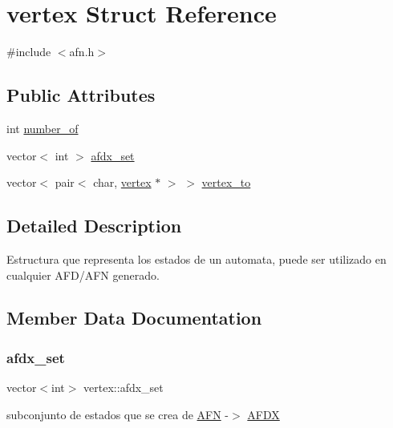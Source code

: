 \hypertarget{structvertex}{}\section{vertex Struct Reference}
\label{structvertex}


{\ttfamily \#include $<$afn.\+h$>$}

\subsection*{Public Attributes}
{\bf }\par
\begin{DoxyCompactItemize}
\item 
int \hyperlink{structvertex_a20bec257a9da87360e7eff821886331b}{number\+\_\+of}
\item 
vector$<$ int $>$ \hyperlink{structvertex_ac03479cb9e9f8fd0ee66e9f14fca15a9}{afdx\+\_\+set}
\item 
vector$<$ pair$<$ char, \hyperlink{structvertex}{vertex} $\ast$ $>$ $>$ \hyperlink{structvertex_af4c8458ab477f8d174bd3764611f18f6}{vertex\+\_\+to}
\end{DoxyCompactItemize}



\subsection{Detailed Description}
Estructura que representa los estados de un automata, puede ser utilizado en cualquier A\+F\+D/\+A\+FN generado. 

\subsection{Member Data Documentation}
\hypertarget{structvertex_ac03479cb9e9f8fd0ee66e9f14fca15a9}{}\label{structvertex_ac03479cb9e9f8fd0ee66e9f14fca15a9} 
\subsubsection{\texorpdfstring{afdx\+\_\+set}{afdx\_set}}
{\footnotesize\ttfamily vector$<$int$>$ vertex\+::afdx\+\_\+set}

subconjunto de estados que se crea de \hyperlink{class_a_f_n}{A\+FN} -\/$>$ \hyperlink{class_a_f_d_x}{A\+F\+DX} \hypertarget{structvertex_a20bec257a9da87360e7eff821886331b}{}\label{structvertex_a20bec257a9da87360e7eff821886331b} 

